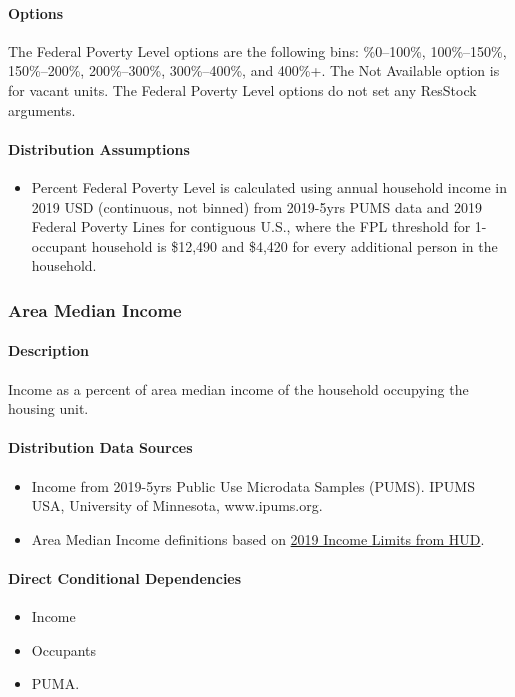 \paragraph{Options}
The Federal Poverty Level options are the following bins: \%0--100\%, 100\%--150\%, 150\%--200\%, 200\%--300\%, 300\%--400\%, and 400\%+. The Not Available option is for vacant units. The Federal Poverty Level options do not set any ResStock arguments.

\paragraph{Distribution Assumptions}
\begin{itemize}
\item
  Percent Federal Poverty Level is calculated using annual household income
  in 2019 USD (continuous, not binned) from 2019-5yrs PUMS data and 2019
  Federal Poverty Lines for contiguous U.S., where the FPL threshold for
  1-occupant household is \$12,490 and \$4,420 for every additional person
  in the household.
\end{itemize}

\subsubsection{Area Median Income}\label{area_median_income}
\paragraph{Description}
Income as a percent of area median income of the household occupying the housing unit.

\paragraph{Distribution Data Sources}
\begin{itemize}
\item 
  Income from 2019-5yrs Public Use Microdata Samples (PUMS). IPUMS USA, University of Minnesota, www.ipums.org.
\item 
  Area Median Income definitions based on \href{https://www.huduser.gov/portal/datasets/il.html#data_2019}{2019 Income Limits from HUD}.
  
\end{itemize}

\paragraph{Direct Conditional Dependencies}
\begin{itemize}
    \item Income
    \item Occupants
    \item PUMA.
\end{itemize}


